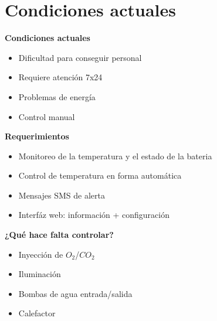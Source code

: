 \documentclass[11pt]{beamer}
\begin{document}
\section[Problema]{Condiciones actuales}

\begin{frame}{\textbf{\LARGE{Condiciones actuales}}}
  \fontsize{18pt}{18}\selectfont
  \begin{itemize}
    \item { Dificultad para conseguir personal }
        \vspace{20px}
    \item Requiere atención 7x24
        \vspace{20px}
    \item Problemas de energía
        \vspace{10px}
    \item Control manual
  \end{itemize}
\end{frame}

\begin{frame}{\textbf{\LARGE{Requerimientos}}}
  \fontsize{18pt}{18}\selectfont
  \begin{minipage}[c]{1.0\linewidth}
    \centering
      \begin{itemize}
        \item Monitoreo de la temperatura y el estado de la bateria
          \vspace{10px}
        \item Control de temperatura en forma automática
          \vspace{10px}      	
        \item Mensajes SMS de alerta
          \vspace{10px}
        \item Interfáz web: información + configuración
          \vspace{10px}
      \end{itemize}
  \end{minipage}
\end{frame}


\begin{frame}{\textbf{\LARGE{¿Qué hace falta controlar?}}}
  \fontsize{18pt}{18}\selectfont
  \begin{minipage}[c]{1.0\linewidth}
    \centering
    \begin{itemize}
        \vspace{-20px}
      \item Inyección de $O_2$/$CO_2$
        \vspace{15px}
      \item Iluminación
        \vspace{15px}
      \item Bombas de agua entrada/salida
        \vspace{15px}
      \item Calefactor
    \end{itemize}
  \end{minipage}
\end{frame}
\end{document}
